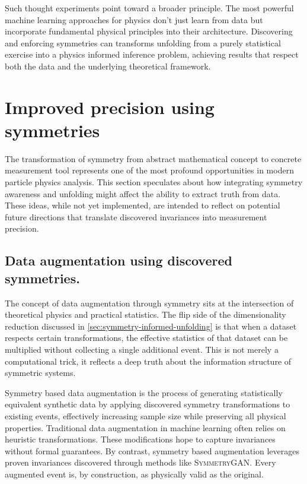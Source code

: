         Such thought experiments point toward a broader principle.
        The most powerful machine learning approaches for physics don't just learn from data but incorporate fundamental physical principles into their architecture.
        Discovering and enforcing symmetries can transforms unfolding from a purely statistical exercise into a physics informed inference problem, achieving results that respect both the data and the underlying theoretical framework.

\section{Improved precision using symmetries}
\label{sec:improved-measurement-prediction}
    The transformation of symmetry from abstract mathematical concept to concrete measurement tool represents one of the most profound opportunities in modern particle physics analysis.
    This section speculates about how integrating symmetry awareness and unfolding might affect the ability to extract truth from data.
    These ideas, while not yet implemented, are intended to reflect on potential future directions that translate discovered invariances into measurement precision.
    \subsection{Data augmentation using discovered symmetries.}
        The concept of data augmentation through symmetry sits at the intersection of theoretical physics and practical statistics.
        The flip side of the dimensionality reduction discussed in \cref{sec:symmetry-informed-unfolding} is that when a dataset respects certain transformations, the effective statistics of that dataset can be multiplied without collecting a single additional event.
        This is not merely a computational trick, it reflects a deep truth about the information structure of symmetric systems.

        Symmetry based data augmentation is the process of generating statistically equivalent synthetic data by applying discovered symmetry transformations to existing events, effectively increasing sample size while preserving all physical properties.
        Traditional data augmentation in machine learning often relies on heuristic transformations.
        These modifications hope to capture invariances without formal guarantees.
        By contrast, symmetry based augmentation leverages proven invariances discovered through methods like \textsc{SymmetryGAN}.
        Every augmented event is, by construction, as physically valid as the original.

